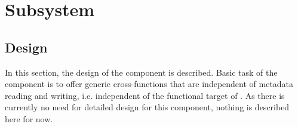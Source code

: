 \chapter{Subsystem \SUBSTechBase{}}
\label{sec:SUBSUtilitydes}


\section{\COMPutility{} Design}
\label{sec:COMPutilityDesign}

In this section, the design of the component \COMPutility{} is described. Basic task of the component is to offer generic cross-functions that are independent of metadata reading and writing, i.e. independent of the functional target of \LibName{}. As there is currently no need for detailed design for this component, nothing is described here for now.





